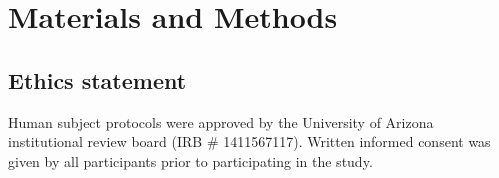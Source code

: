 \documentclass[12pt]{article}
\begin{document}
{%









\section*{Materials and Methods}
\subsection*{Ethics statement}
Human subject protocols were approved by the University of Arizona institutional review board (IRB \# 1411567117). Written informed consent was given by all participants prior to participating in the study. 

}
\end{document}
